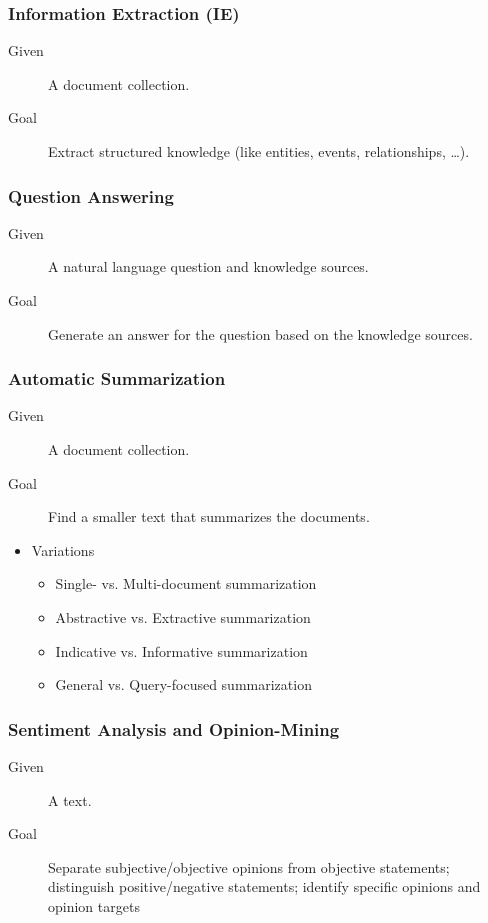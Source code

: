 			\subsubsection{Information Extraction (IE)} %
				\begin{description}
					\item[Given] A document collection.
					\item[Goal] Extract structured knowledge (like entities, events, relationships, \dots).
				\end{description}

			\subsubsection{Question Answering} %
				\begin{description}
					\item[Given] A natural language question and knowledge sources.
					\item[Goal] Generate an answer for the question based on the knowledge sources.
				\end{description}

			\subsubsection{Automatic Summarization} %
				\begin{description}
					\item[Given] A document collection.
					\item[Goal] Find a smaller text that summarizes the documents.
				\end{description}
				\begin{itemize}
					\item Variations
						\begin{itemize}
							\item Single- vs. Multi-document summarization
							\item Abstractive vs. Extractive summarization
							\item Indicative vs. Informative summarization
							\item General vs. Query-focused summarization
						\end{itemize}
				\end{itemize}

			\subsubsection{Sentiment Analysis and Opinion-Mining} %
				\begin{description}
					\item[Given] A text.
					\item[Goal] Separate subjective/objective opinions from objective statements; distinguish positive/negative statements; identify specific opinions and opinion targets
				\end{description}

